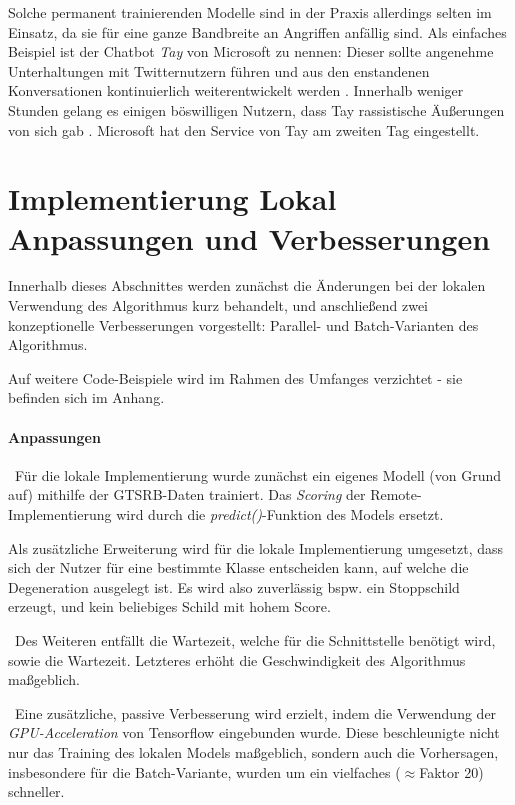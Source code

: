 Solche permanent trainierenden Modelle sind in der Praxis allerdings selten im Einsatz, da sie für eine ganze Bandbreite an Angriffen anfällig sind. Als einfaches Beispiel ist der Chatbot \textit{Tay} von Microsoft zu nennen: Dieser sollte angenehme Unterhaltungen mit Twitternutzern führen und aus den enstandenen Konversationen kontinuierlich weiterentwickelt werden \cite{mstay}. Innerhalb weniger Stunden gelang es einigen böswilligen Nutzern, dass Tay rassistische Äußerungen von sich gab \cite{mstaydown}. Microsoft hat den Service von Tay am zweiten Tag eingestellt. 
\section[Implementierung Lokal]{Implementierung Lokal \newline Anpassungen und Verbesserungen}
\label{sec:DegenerationLokal}

Innerhalb dieses Abschnittes werden zunächst die Änderungen bei der lokalen Verwendung des Algorithmus kurz behandelt, und anschließend zwei konzeptionelle Verbesserungen vorgestellt: Parallel- und Batch-Varianten des Algorithmus. 

Auf weitere Code-Beispiele wird im Rahmen des Umfanges verzichtet - sie befinden sich im Anhang.

\paragraph{Anpassungen} ~\newline Für die lokale Implementierung wurde zunächst ein eigenes Modell (von Grund auf) mithilfe der \ac{GTSRB}-Daten trainiert. Das \textit{Scoring} der Remote-Implementierung wird durch die \textit{predict()}-Funktion des Models ersetzt.

Als zusätzliche Erweiterung wird für die lokale Implementierung umgesetzt, dass sich der Nutzer für eine bestimmte Klasse entscheiden kann, auf welche die Degeneration ausgelegt ist. Es wird also zuverlässig bspw. ein Stoppschild erzeugt, und kein beliebiges Schild mit hohem Score. 

~\newline Des Weiteren entfällt die Wartezeit, welche für die Schnittstelle benötigt wird, sowie die Wartezeit. Letzteres erhöht die Geschwindigkeit des Algorithmus maßgeblich. 

~\newline Eine zusätzliche, passive Verbesserung wird erzielt, indem die Verwendung der \textit{GPU-Acceleration} von Tensorflow eingebunden wurde. Diese beschleunigte nicht nur das Training des lokalen Models maßgeblich, sondern auch die Vorhersagen, insbesondere für die Batch-Variante, wurden um ein vielfaches ($\approx$Faktor 20) schneller.  

